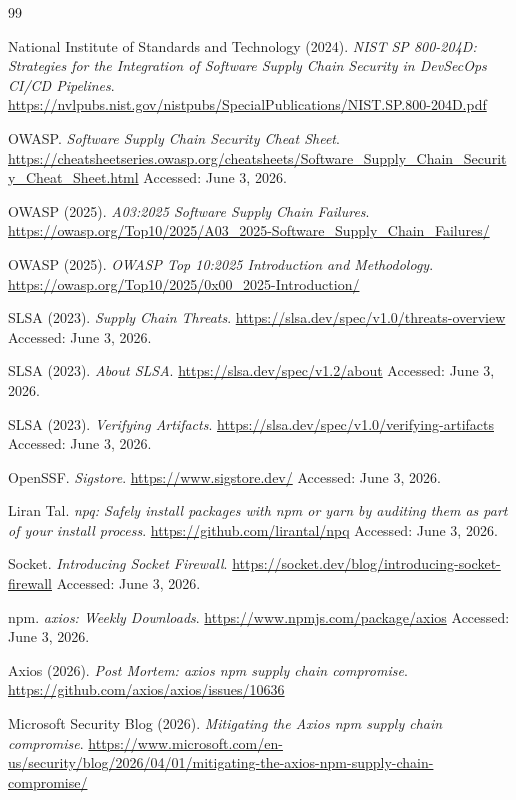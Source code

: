 \documentclass[12pt,a4paper]{article}
\begin{document}
\newpage
\begin{thebibliography}{99}
\raggedright

National Institute of Standards and Technology (2024).
\textit{NIST SP 800-204D: Strategies for the Integration of Software Supply Chain Security in DevSecOps CI/CD Pipelines}.
\url{https://nvlpubs.nist.gov/nistpubs/SpecialPublications/NIST.SP.800-204D.pdf}

OWASP.
\textit{Software Supply Chain Security Cheat Sheet}.
\url{https://cheatsheetseries.owasp.org/cheatsheets/Software_Supply_Chain_Security_Cheat_Sheet.html}
Accessed: June 3, 2026.

OWASP (2025).
\textit{A03:2025 Software Supply Chain Failures}.
\url{https://owasp.org/Top10/2025/A03_2025-Software_Supply_Chain_Failures/}

OWASP (2025).
\textit{OWASP Top 10:2025 Introduction and Methodology}.
\url{https://owasp.org/Top10/2025/0x00_2025-Introduction/}

SLSA (2023).
\textit{Supply Chain Threats}.
\url{https://slsa.dev/spec/v1.0/threats-overview}
Accessed: June 3, 2026.

SLSA (2023).
\textit{About SLSA}.
\url{https://slsa.dev/spec/v1.2/about}
Accessed: June 3, 2026.

SLSA (2023).
\textit{Verifying Artifacts}.
\url{https://slsa.dev/spec/v1.0/verifying-artifacts}
Accessed: June 3, 2026.

OpenSSF.
\textit{Sigstore}.
\url{https://www.sigstore.dev/}
Accessed: June 3, 2026.

Liran Tal.
\textit{npq: Safely install packages with npm or yarn by auditing them as part of your install process}.
\url{https://github.com/lirantal/npq}
Accessed: June 3, 2026.

Socket.
\textit{Introducing Socket Firewall}.
\url{https://socket.dev/blog/introducing-socket-firewall}
Accessed: June 3, 2026.

npm.
\textit{axios: Weekly Downloads}.
\url{https://www.npmjs.com/package/axios}
Accessed: June 3, 2026.

Axios (2026).
\textit{Post Mortem: axios npm supply chain compromise}.
\url{https://github.com/axios/axios/issues/10636}

Microsoft Security Blog (2026).
\textit{Mitigating the Axios npm supply chain compromise}.
\url{https://www.microsoft.com/en-us/security/blog/2026/04/01/mitigating-the-axios-npm-supply-chain-compromise/}


\end{thebibliography}
\end{document}
